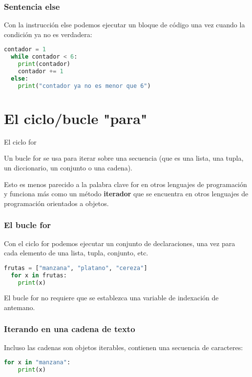 \begin{frame}[fragile]
  \frametitle{Sentencia \textbf{else}}

  Con la instrucción \textcolor{codeKeyword}{else} podemos ejecutar un bloque de código
  una vez cuando la condición ya no es verdadera:

  \vspace{\baselineskip}
  \begin{lstlisting}[language=Python]
  contador = 1
  while contador < 6:
    print(contador)
    contador += 1
  else:
    print("contador ya no es menor que 6")
  \end{lstlisting}
\end{frame}

\section{El ciclo/bucle "para"}

\begin{frame}[c]{El ciclo for}

  Un bucle \textcolor{codeKeyword}{for} se usa para iterar sobre una secuencia
  (que es una lista, una tupla, un diccionario, un conjunto o una cadena).

  \vspace{\baselineskip}
  Esto es menos parecido a la palabra clave \textcolor{codeKeyword}{for} en
  otros lenguajes de programación y funciona más como un método
  \textbf{iterador} que se encuentra en otros lenguajes de programación
  orientados a objetos.
\end{frame}

\begin{frame}[fragile]
  \frametitle{El bucle for}

  Con el ciclo for podemos ejecutar un conjunto de declaraciones,
  una vez para cada elemento de una lista, tupla, conjunto, etc.

  \vspace{\baselineskip}
  \begin{lstlisting}[language=Python]
  frutas = ["manzana", "platano", "cereza"]
  for x in frutas:
    print(x)
  \end{lstlisting}

  \vspace{\baselineskip}
  El bucle for no requiere que se establezca una variable de
  indexación de antemano.
\end{frame}

\begin{frame}[fragile]
  \frametitle{Iterando en una cadena de texto}

  Incluso las cadenas son objetos iterables, contienen una
  secuencia de caracteres:

  \vspace{\baselineskip}
  \begin{lstlisting}[language=Python]
  for x in "manzana":
    print(x)
  \end{lstlisting}
\end{frame}

